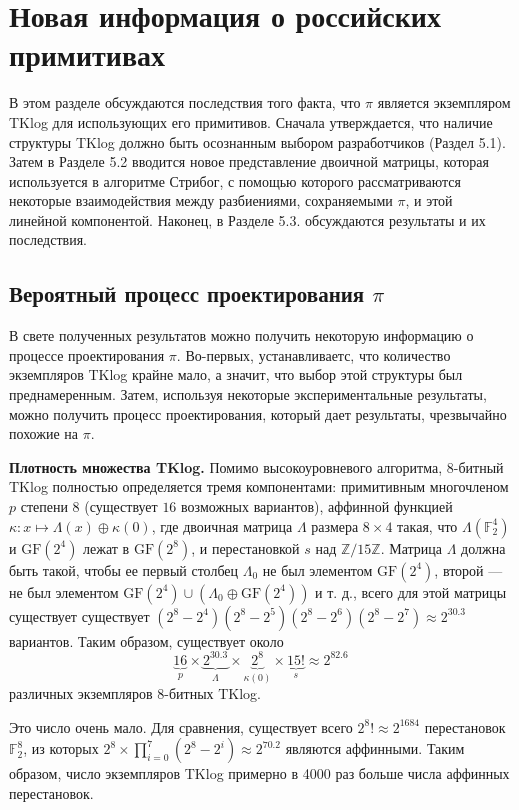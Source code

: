 \section{Новая информация о российских примитивах}

В этом разделе обсуждаются последствия того факта, что \(\pi\) является экземпляром TKlog для использующих его примитивов. Сначала утверждается, что наличие структуры TKlog должно быть осознанным выбором разработчиков (Раздел 5.1). Затем в Разделе 5.2 вводится новое представление двоичной матрицы, которая используется в алгоритме Стрибог, с помощью которого рассматриваются некоторые взаимодействия между разбиениями, сохраняемыми \(\pi\), и этой линейной компонентой. Наконец, в Разделе 5.3. обсуждаются результаты и их последствия.

\subsection{Вероятный процесс проектирования \(\pi\)}
В свете полученных результатов можно получить некоторую информацию о процессе проектирования \(\pi\). Во-первых, устанавливаетс, что количество экземпляров TKlog крайне мало, а значит, что выбор этой структуры был преднамеренным. Затем, используя некоторые экспериментальные результаты, можно получить процесс проектирования, который дает результаты, чрезвычайно похожие на \(\pi\).

\textbf{Плотность множества TKlog.} Помимо высокоуровневого алгоритма, 8-битный TKlog полностью определяется тремя компонентами: примитивным многочленом \(p\) степени $8$ (существует $16$ возможных вариантов), аффинной функцией \(\kappa : x \mapsto \Lambda(x) \oplus \kappa(0)\), где двоичная матрица \(\Lambda\) размера \(8 \times 4\) такая, что \(\Lambda(\mathbb{F}_{2}^{4})\) и \(\text{GF}(2^4)\) лежат в \(\text{GF}(2^8)\), и перестановкой \(s\) над \(\mathbb{Z}/15\mathbb{Z}\). Матрица \(\Lambda\) должна быть такой, чтобы ее первый столбец \(\Lambda_0\) не был элементом \(\text{GF}(2^4)\), второй — не был элементом \(\text{GF}(2^4) \cup (\Lambda_0 \oplus \text{GF}(2^4))\) и т. д., всего для этой матрицы существует существует \((2^8 - 2^4)(2^8 - 2^5)(2^8 - 2^6)(2^8 - 2^7) \approx 2^{30.3}\) вариантов. Таким образом, существует около
\[
  \underbrace{16}_{p} \times \underbrace{2^{30.3}}_{\Lambda} \times \underbrace{2^8}_{\kappa(0)} \times \underbrace{15!}_{s} \approx 2^{82.6}
\]
различных экземпляров 8-битных TKlog.

Это число очень мало. Для сравнения, существует всего \(2^8! \approx 2^{1684}\) перестановок \(\mathbb{F}_2^8\), из которых \(2^8 \times \prod_{i=0}^{7}(2^8 - 2^i) \approx 2^{70.2}\) являются аффинными. Таким образом, число экземпляров TKlog примерно в 4000 раз больше числа аффинных перестановок.

